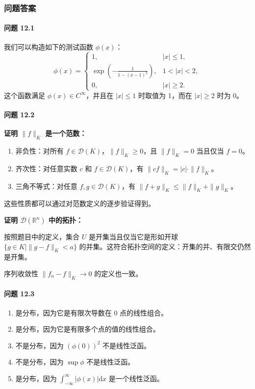 \subsubsection{问题答案}
\paragraph{问题 12.1}

我们可以构造如下的测试函数 $\phi(x)$：
 $$
\phi(x) =
\begin{cases}
1, & |x| \leq 1, \\
\exp(-\frac{1}{1 - (x - 1)^2}), & 1 < |x| < 2, \\
0, & |x| \geq 2.
\end{cases}
$$
这个函数满足 $\phi(x) \in C^\infty$，并且在 $|x| \leq 1$ 时取值为
1，而在 $|x| \geq 2$ 时为 0。

\paragraph{问题 12.2}\label{ux95eeux9898-12.2}

\textbf{证明 $\|f\|_K$ 是一个范数：}

\begin{enumerate}

\item
  非负性：对所有 $f \in \mathcal{D}(K)$，$\|f\|_K \geq 0$，且
  $\|f\|_K = 0$ 当且仅当 $f = 0$。
\item
  齐次性：对任意实数 $c$ 和 $f \in \mathcal{D}(K)$，有
  $\|cf\|_K = |c| \cdot \|f\|_K$。
\item
  三角不等式：对任意 $f, g \in \mathcal{D}(K)$，有
  $\|f + g\|_K \leq \|f\|_K + \|g\|_K$。
\end{enumerate}

这些性质都可以通过对范数定义的逐步验证得到。

\textbf{证明 $\mathcal{D}(\mathbb{R}^n)$ 中的拓扑：}

按照题目中的定义，集合 $U$ 是开集当且仅当它是形如开球
$\{g \in K \mid \|g - f\|_K < a\}$
的并集。这符合拓扑空间的定义：开集的并、有限交仍然是开集。

序列收敛性 $\|f_n - f\|_K \to 0$ 的定义也一致。

\paragraph{问题 12.3}\label{ux95eeux9898-12.3}

\begin{enumerate}
\def\labelenumi{(\alph{enumi})}
\item
  是分布，因为它是有限次导数在 0 点的线性组合。
\item
  是分布，因为它是有限多个点的值的线性组合。
\item
  不是分布，因为 $(\phi(0))^2$ 不是线性泛函。
\item
  不是分布，因为 $\sup \phi$ 不是线性泛函。
\item
  是分布，因为 $\int_{-\infty}^\infty |\phi(x)| \mathrm{d}x$
  是一个线性泛函。
\end{enumerate}

